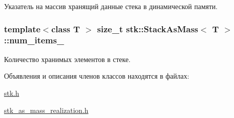 Указатель на массив хранящий данные стека в динамической памяти. 

\hypertarget{classstk_1_1_stack_as_mass_a5e9451aac734a824c73b3d7054093fef}{}
\subsubsection[{num\+\_\+items\+\_\+}]{\setlength{\rightskip}{0pt plus 5cm}template$<$class T $>$ size\+\_\+t {\bf stk\+::\+Stack\+As\+Mass}$<$ T $>$\+::num\+\_\+items\+\_\+\hspace{0.3cm}{\ttfamily [private]}}\label{classstk_1_1_stack_as_mass_a5e9451aac734a824c73b3d7054093fef}


Количество хранимых элементов в стеке. 



Объявления и описания членов классов находятся в файлах\+:\begin{DoxyCompactItemize}
\item 
\hyperlink{stk_8h}{stk.\+h}\item 
\hyperlink{stk__as__mass__realization_8h}{stk\+\_\+as\+\_\+mass\+\_\+realization.\+h}\end{DoxyCompactItemize}
